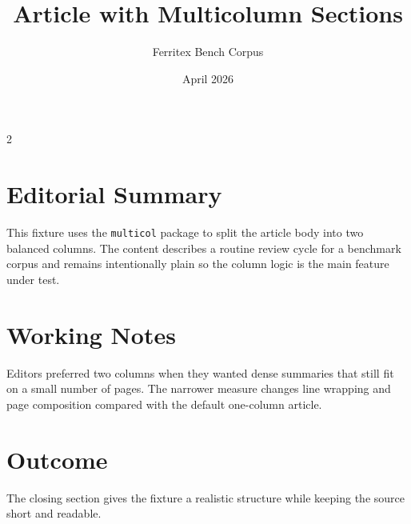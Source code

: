 \documentclass{article}
\title{Article with Multicolumn Sections}
\author{Ferritex Bench Corpus}
\date{April 2026}
\begin{document}
\maketitle

\begin{multicols}{2}
\section{Editorial Summary}
This fixture uses the \texttt{multicol} package to split the article body
into two balanced columns. The content describes a routine review cycle for a
benchmark corpus and remains intentionally plain so the column logic is the
main feature under test.

\section{Working Notes}
Editors preferred two columns when they wanted dense summaries that still fit
on a small number of pages. The narrower measure changes line wrapping and
page composition compared with the default one-column article.

\section{Outcome}
The closing section gives the fixture a realistic structure while keeping the
source short and readable.
\end{multicols}
\end{document}
